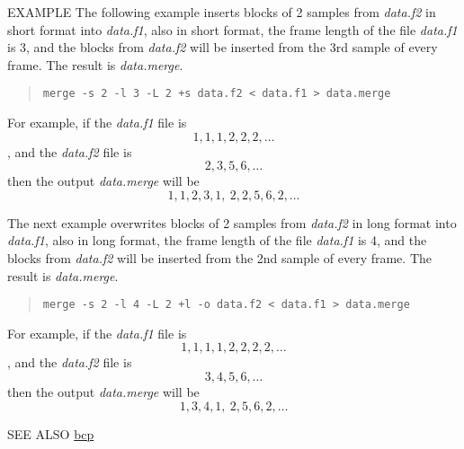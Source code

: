 \begin{options}
\end{options}


\begin{qsection}{EXAMPLE}
The following example inserts blocks of 2 samples from {\em data.f2}
in short format into {\em data.f1}, also in short format,
the frame length of the file {\em data.f1} is 3, and the blocks
from {\em data.f2} will be inserted from the 3rd sample of
every frame.
The result is {\em data.merge}.
\begin{quote}
 \verb!merge -s 2 -l 3 -L 2 +s data.f2 < data.f1 > data.merge!
\end{quote}
For example, if the {\em data.f1} file is 
\[ 1,1,1,2,2,2,\dots \], 
and the {\em data.f2} file is 
\[ 2,3,5,6,\dots \]
then the output {\em data.merge} will be 
\[ 1,1,2,3,1,~ 2,2,5,6,2,\dots \] 

The next example overwrites blocks of 2 samples from {\em data.f2}
in long format into {\em data.f1}, also in long format,
the frame length of the file {\em data.f1} is 4, and the blocks
from {\em data.f2} will be inserted from the 2nd sample of
every frame.
The result is {\em data.merge}.
\begin{quote}
 \verb!merge -s 2 -l 4 -L 2 +l -o data.f2 < data.f1 > data.merge!
\end{quote}
For example, if the {\em data.f1} file is 
\[ 1,1,1,1,2,2,2,2,\dots \], 
and the {\em data.f2} file is 
\[ 3,4,5,6,\dots \]
then the output {\em data.merge} will be 
\[  1,3,4,1,~ 2,5,6,2,\dots \] 

\end{qsection}

\begin{qsection}{SEE ALSO}
\hyperlink{bcp}{bcp}
\end{qsection}
